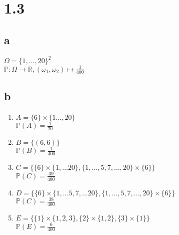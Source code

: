 \documentclass{article}
\begin{document}
    \section*{1.3}
        \subsection*{a}
            $\Omega = \{1,\hdots,20\}^2$\\
            $\mathbb P: \Omega \rightarrow \mathbb R, (\omega_1, \omega_2) \mapsto \frac{1}{400}$
        \subsection*{b}
            \begin{enumerate}
                \item{$A = \{6\} \times \{1\hdots,20\}$\\
                    $\mathbb P (A) = \frac{1}{20}$}
                \item{$B = \{(6, 6)\}$\\
                    $\mathbb P (B) = \frac{1}{400}$}
                \item{$C = \{\{6\}\times \{1,\hdots 20\}, \{1,\hdots,5,7,\hdots,20\}\times\{6\}\}$\\
                    $\mathbb P(C) = \frac{39}{400}$}
                \item{$D = \{\{6\}\times \{1,\hdots 5,7,\hdots 20\}, \{1,\hdots,5,7,\hdots,20\}\times\{6\}\}$\\
                    $\mathbb P(C) = \frac{38}{400}$}
                \item{$E = \{\{1\}\times\{1,2,3\},\{2\}\times\{1,2\},\{3\}\times\{1\}\}$\\
                    $\mathbb P(E) = \frac{6}{400}$}
            \end{enumerate}
\end{document}
